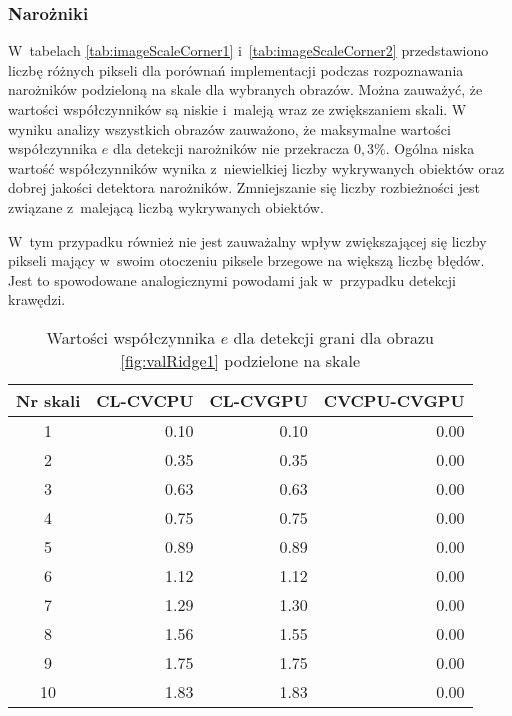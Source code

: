 \subsubsection{Narożniki}
\label{subsubsec:naroznikiTabele}

W~tabelach \ref{tab:imageScaleCorner1} i~\ref{tab:imageScaleCorner2} przedstawiono liczbę różnych pikseli dla porównań implementacji podczas rozpoznawania narożników podzieloną na skale dla wybranych obrazów. Można zauważyć, że wartości współczynników są niskie i~maleją wraz ze zwiększaniem skali. W wyniku analizy wszystkich obrazów zauważono, że maksymalne wartości współczynnika $ e $ dla detekcji narożników nie przekracza $ 0,3 \% $. Ogólna niska wartość współczynników wynika z~niewielkiej liczby wykrywanych obiektów oraz dobrej jakości detektora narożników. Zmniejszanie się liczby rozbieżności jest związane z~malejącą liczbą wykrywanych obiektów.

W~tym przypadku również nie jest zauważalny wpływ zwiększającej się liczby pikseli mający w~swoim otoczeniu piksele brzegowe na większą liczbę błędów. Jest to spowodowane analogicznymi powodami jak w~przypadku detekcji krawędzi.


\begin{center}
\begin{table}
\centering
\caption{Wartości współczynnika $ e $ dla detekcji grani dla obrazu \ref{fig:valRidge1} podzielone na skale}
\label{tab:imageScaleRidge1}
\begin{tabular}{|c|r|r|r|}
 \hline
Nr skali & CL-CVCPU & CL-CVGPU & CVCPU-CVGPU \\ \hline
1        & 0.10     & 0.10     & 0.00        \\ \hline
2        & 0.35     & 0.35     & 0.00        \\ \hline
3        & 0.63     & 0.63     & 0.00        \\ \hline
4        & 0.75     & 0.75     & 0.00        \\ \hline
5        & 0.89     & 0.89     & 0.00        \\ \hline
6        & 1.12     & 1.12     & 0.00        \\ \hline
7        & 1.29     & 1.30     & 0.00        \\ \hline
8        & 1.56     & 1.55     & 0.00        \\ \hline
9        & 1.75     & 1.75     & 0.00        \\ \hline
10       & 1.83     & 1.83     & 0.00        \\ \hline
\end{tabular}
\end{table}
\end{center}


